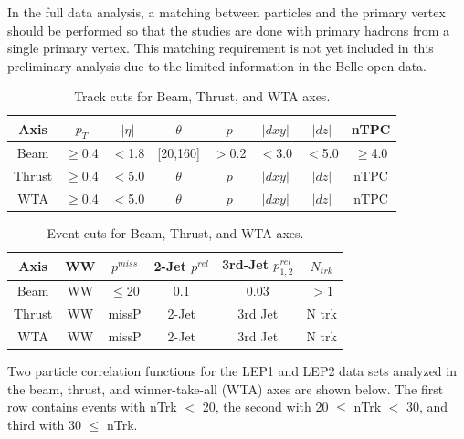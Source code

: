 In the full data analysis, a matching between particles and the primary vertex should be performed so that the studies are done with primary hadrons from a single primary vertex. This matching requirement is not yet included in this preliminary analysis due to the limited information in the Belle open data. 

\begin{table}[h!]\centering
{}

\begin{tabular}{cccccccc}\toprule
Axis & ${p_{T}}$ & $|\eta|$ & $\theta$ & ${p}$ & $|dxy|$ & $|dz|$ & nTPC\\
\midrule
\rowcolor{black!20}Beam & $\geq$0.4 & $<$1.8 & [20,160] & $>$0.2 & $<$3.0 & $<$5.0 & $\geq$4.0 \\
Thrust & $\geq$0.4 & $<$5.0 & $\theta$ & ${p}$ & $|dxy|$ & $|dz|$ & nTPC \\
\rowcolor{black!20}WTA & $\geq$0.4 & $<$5.0 & $\theta$ & ${p}$ & $|dxy|$ & $|dz|$ & nTPC \\
\bottomrule
\end{tabular}
\caption{Track cuts for Beam, Thrust, and WTA axes.}
\end{table}

\begin{table}[h!]\centering
{}

\begin{tabular}{cccccc}\toprule
Axis & WW & ${p^{miss}}$ & 2-Jet ${p^{rel}}$ & 3rd-Jet ${p^{rel}_{1,2}}$ &
$N_{trk}$ \\
\midrule
\rowcolor{black!20}Beam & WW & $\leq$20 & 0.1 & 0.03 & $>$1 \\
Thrust & WW & missP & 2-Jet & 3rd Jet & N trk \\
\rowcolor{black!20}WTA & WW & missP & 2-Jet & 3rd Jet & N trk \\
\bottomrule
\end{tabular}
\caption{Event cuts for Beam, Thrust, and WTA axes.}
\end{table}

Two particle correlation functions for the LEP1 and LEP2 data sets analyzed in the beam, thrust, and winner-take-all (WTA) axes are shown below. The first row contains events with nTrk $<$ 20, the second with 20 $\leq$ nTrk $<$ 30, and third with 30 $\leq$ nTrk.



